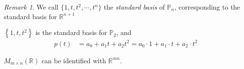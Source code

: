\documentclass{beamer}
\theoremstyle{definition}
\theoremstyle{remark}
\newtheorem*{remark}{Remark}
\begin{document}
\begin{frame}[t]
\begin{remark}
We call $\{1,t,t^2,\cdots,t^n\}$ the \textit{standard basis} of $\mathbb P_n$, corresponding to the standard basis for $\mathbb R^{n+1}$
\end{remark}
\pause
\begin{example}
$\left\{1,t,t^2\right\}$ is the standard basis for $\mathbb P_2$, and
\begin{align*}
p(t)&=a_0+a_1t+a_2t^2=a_0\cdot 1+a_1\cdot t+a_2\cdot t^2
\end{align*}
\end{example}
\end{frame}

\begin{frame}[t]
\begin{example}\label{17:53-06/27/2022}
$M_{m\times n}(\mathbb R)$ can be identified with $\mathbb R^{mn}$.\pause\\
\end{example}
\end{frame}
\end{document}
